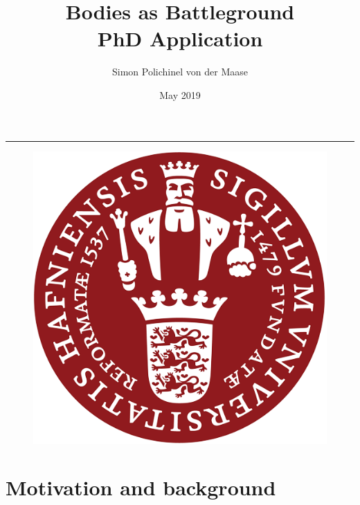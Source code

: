 \documentclass[a4paper]{article}
\title{\textbf{Bodies as Battleground} \\ PhD Application}
\author{Simon Polichinel von der Maase}
\date{May 2019}
\begin{document}
	\begin{titlepage}
		\maketitle
		\noindent\rule{\linewidth}{0.4pt}
		\begin{figure}[h]
			\centering
			\includegraphics[scale=0.32]{KU_logo.png}
		\end{figure}
		\thispagestyle{empty} %
	\end{titlepage}
    \tableofcontents
\pagebreak


\section{Motivation and background} 

\end{document}
